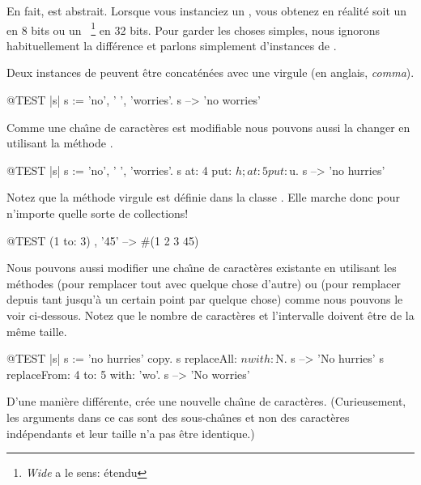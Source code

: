 \documentclass[a4paper,10pt,twoside]{book}
\begin{document}
En fait,  est abstrait.
Lorsque vous instanciez un , vous obtenez en r\'ealit\'e soit
un  en 8 bits ou un ~\footnote{\emph{Wide} a le sens: \'etendu} en 32 bits.
Pour garder les choses simples, nous ignorons habituellement la diff\'erence
et parlons simplement d'instances de  
 .

Deux instances de  peuvent \^etre concat\'en\'ees avec une virgule (en anglais, \emph{comma}).
\begin{code}{@TEST |s|}
s := 'no', ' ', 'worries'.
s -->  'no worries'
\end{code}

Comme une cha\^{\i}ne de caract\`eres est modifiable nous pouvons aussi la
changer en utilisant la m\'ethode .

\begin{code}{@TEST |s| s := 'no', ' ', 'worries'.}
s at: 4 put: $h; at: 5 put: $u.
s --> 'no hurries'
\end{code}

Notez que la m\'ethode virgule est d\'efinie dans la classe .
Elle marche donc pour n'importe quelle sorte de collections!
\begin{code}{@TEST}
(1 to: 3) , '45' --> #(1 2 3 $4 $5)
\end{code}

Nous pouvons aussi modifier une cha\^{\i}ne de caract\`eres existante
en utilisant les m\'ethodes  
(pour remplacer tout avec quelque chose d'autre)
ou 
(pour remplacer depuis tant jusqu'\`a un certain point par quelque chose)
comme nous pouvons le voir ci-dessous. Notez que le nombre de caract\`eres
et l'intervalle doivent \^etre de la m\^eme taille.

\begin{code}{@TEST |s| s := 'no hurries' copy.}
s replaceAll: $n with: $N.
s --> 'No hurries'
s replaceFrom: 4 to: 5 with: 'wo'.
s --> 'No worries'
\end{code}

D'une mani\`ere diff\'erente,  cr\'ee 
une nouvelle cha\^{\i}ne de caract\`eres.
(Curieusement, les arguments dans ce cas sont des sous-cha\^{\i}nes et non des caract\`eres ind\'ependants et leur taille n'a pas \^etre identique.)
\end{document}
